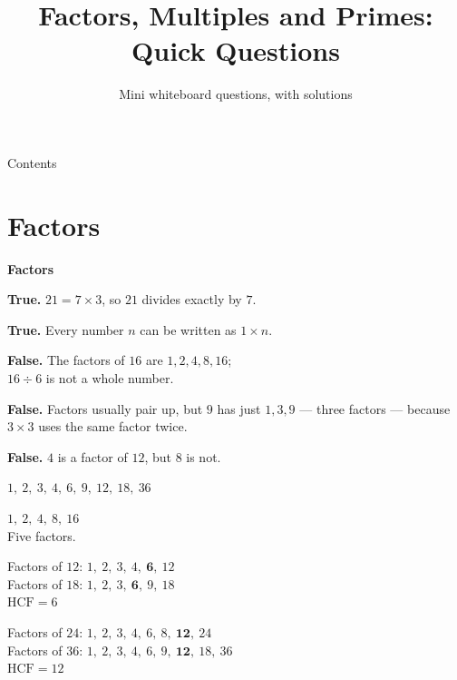 \documentclass[aspectratio=169]{beamer}
\title{Factors, Multiples and Primes: Quick Questions}
\subtitle{Mini whiteboard questions, with solutions}
\author{}
\date{}
\newcommand{\qtopic}[1]{%
  \section{#1}%
  \begin{frame}
    \vfill
    \begin{center}
      {\usebeamercolor[fg]{structure}\Huge\bfseries #1}
    \end{center}
    \vfill
  \end{frame}%
}
\begin{document}
\frame{\titlepage}

\begin{frame}[label=contents]{Contents}
  \small
  \tableofcontents
\end{frame}

\qtopic{Factors}

  {\textbf{True.} $21=7\times 3$, so $21$ divides exactly by $7$.}

  {\textbf{True.} Every number $n$ can be written as $1\times n$.}

  {\textbf{False.} The factors of $16$ are $1,2,4,8,16$;\\[0.3em]
   $16\div 6$ is not a whole number.}

  {\textbf{False.} Factors usually pair up, but $9$ has just $1,3,9$
   --- three factors --- because $3\times 3$ uses the same factor twice.}

  {\textbf{False.} $4$ is a factor of $12$, but $8$ is not.}



  {$1,\ 2,\ 3,\ 4,\ 6,\ 9,\ 12,\ 18,\ 36$}

  {$1,\ 2,\ 4,\ 8,\ 16$\\[0.3em]Five factors.}

  {Factors of $12$: $1,\ 2,\ 3,\ 4,\ \mathbf{6},\ 12$\\[0.3em]
   Factors of $18$: $1,\ 2,\ 3,\ \mathbf{6},\ 9,\ 18$\\[0.3em]
   $\mathrm{HCF}=6$}

  {Factors of $24$: $1,\ 2,\ 3,\ 4,\ 6,\ 8,\ \mathbf{12},\ 24$\\[0.3em]
   Factors of $36$: $1,\ 2,\ 3,\ 4,\ 6,\ 9,\ \mathbf{12},\ 18,\ 36$\\[0.3em]
   $\mathrm{HCF}=12$}
\end{document}
